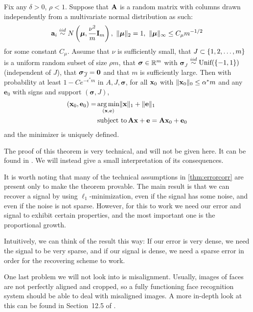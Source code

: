 \begin{theorem}
	\label{thm:errorcorr}
	Fix any $ \delta>0 $, $ \rho<1 $. Suppose that $ \mathbf{A} $ is a random matrix with columns drawn independently from a multivariate normal distribution as such:
	\[
		\mathbf{a}_{i} \stackrel{iid}{\sim} N\left(\boldsymbol{\mu}, \frac{\nu^{2}}{m}\mathbf{I}_{m}\right), ~ \lVert\boldsymbol{\mu}\rVert_{2} = 1, ~ \lVert\boldsymbol{\mu}\rVert_{\infty} \leq C_{\mu}m^{-1/2}
	\]
	for some constant $ C_{\mu} $. Assume that $ \nu $ is sufficiently small, that $ J \subset \{1, 2, \ldots, m\} $ is a uniform random subset of size $ \rho m $, that $ \boldsymbol{\sigma} \in \mathbb{R}^{m} $ with $ \boldsymbol{\sigma}_{J} $ $ \stackrel{iid}{\sim} \text{Unif}(\{-1, 1\}) $ (independent of $ J $), that $ \boldsymbol{\sigma}_{\overline{J}} = \mathbf{0} $ and that $ m $ is sufficiently large. Then with probability at least $ 1 - C e^{-\epsilon^{*}m} $ in $ A, J, \boldsymbol{\sigma} $, for all $ \mathbf{x}_{0} $ with $ \lVert\mathbf{x}_{0}\rVert_{0} \leq \alpha^{*}m $ and any $ \mathbf{e}_{0} $ with signs and support $ (\boldsymbol{\sigma}, J) $, 
	\begin{align*}
		\label{eq:errorcorr}
		(\mathbf{x}_{0}, \mathbf{e}_{0}) = & \operatorname*{arg\,min}_{(\mathbf{x},\mathbf{e})} \lVert\mathbf{x}\rVert_{1} + \lVert\mathbf{e}\rVert_{1} \\
                          & \operatorname*{subject~to} \mathbf{A}\mathbf{x} + \mathbf{e} = \mathbf{A}\mathbf{x}_{0} + \mathbf{e}_{0}
	\end{align*}
	and the minimizer is uniquely defined.
\end{theorem}

The proof of this theorem is very technical, and will not be given here. It can be found in \cite{wright10dense}. We will instead give a small interpretation of its consequences. 

It is worth noting that many of the technical assumptions in \cref{thm:errorcorr} are present only to make the theorem provable.  The main result is that we can recover a signal by using $ \ell_{1} $-minimization, even if the signal has some noise, and even if the noise is not sparse. However, for this to work we need our error and signal to exhibit certain properties, and the most important one is the proportional growth. 

Intuitively, we can think of the result this way: If our error is very dense, we need the signal to be very sparse, and if our signal is dense, we need a sparse error in order for the recovering scheme to work. 

One last problem we will not look into is misalignment. Usually, images of faces are not perfectly aligned and cropped, so a fully functioning face recognition system should be able to deal with misaligned images. A more in-depth look at this can be found in Section~12.5 of \cite{eldar12theoryapplic}.









